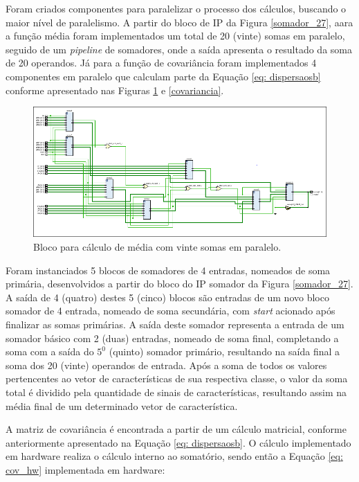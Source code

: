 Foram criados componentes para paralelizar o processo dos cálculos, buscando o maior nível de paralelismo. A partir do bloco de IP da Figura \ref{somador_27}, aara a função média foram implementados um total de 20 (vinte) somas em paralelo, seguido de um \textit{pipeline} de somadores, onde a saída apresenta o resultado da soma de 20 operandos. Já para a função de covariância foram implementados 4 componentes em paralelo que calculam parte da Equação \ref{eq: dispersaosb} conforme apresentado nas Figuras \ref{somador} e \ref{covariancia}.

\begin{figure}[h]
	\centering
	\includegraphics[keepaspectratio=true,scale=0.55]{figuras/rtl_media.png}
	\caption{Bloco para cálculo de média com vinte somas em paralelo.}
	\label{somador}
\end{figure}

Foram instanciados 5 blocos de somadores de 4 entradas, nomeados de soma primária, desenvolvidos a partir do bloco do IP somador da Figura \ref{somador_27}. A saída de 4 (quatro) destes 5 (cinco) blocos são entradas de um novo bloco somador de 4 entrada, nomeado de soma secundária, com \textit{start} acionado após finalizar as somas primárias. A saída deste somador representa a entrada de um somador básico com 2 (duas) entradas, nomeado de soma final, completando a soma com a saída do $5^0$ (quinto) somador primário, resultando na saída final a soma dos 20 (vinte) operandos de entrada.
Após a soma de todos os valores pertencentes ao vetor de características de sua respectiva classe, o valor da soma total é dividido pela quantidade de sinais de características, resultando assim na média final de um determinado vetor de característica. 


A matriz de covariância é encontrada a partir de um cálculo matricial, conforme anteriormente apresentado na Equação \ref{eq: dispersaosb}. O cálculo implementado em hardware realiza o cálculo interno ao somatório, sendo então a Equação \ref{eq: cov_hw} implementada em hardware:

